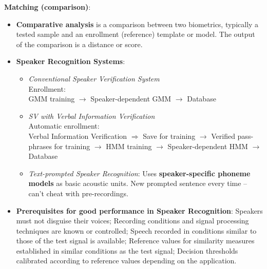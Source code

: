 \documentclass[a4paper]{article}
\begin{document}
      \textbf{Matching (comparison)}:
      \begin{itemize}
        \item \textbf{Comparative analysis} is a comparison between two biometrics, typically a tested sample and an enrollment (reference) template or model. The output of the comparison is a distance or score.
        \item \textbf{Speaker Recognition Systems}:
        \begin{itemize}
          \item \emph{Conventional Speaker Verification System}\\Enrollment: \\
          GMM training $\rightarrow$ Speaker-dependent GMM $\rightarrow$ Database
          \item \emph{SV with Verbal Information Verification}\\Automatic enrollment: \\
          Verbal Information Verification $\Rightarrow$ Save for training $\rightarrow$ Verified pass-phrases for training $\rightarrow$ HMM training $\rightarrow$ Speaker-dependent HMM $\rightarrow$ Database
          \item \emph{Text-prompted Speaker Recognition}: Uses \textbf{speaker-specific phoneme models} as basic acoustic units. New prompted sentence every time -- can't cheat with pre-recordings.
        \end{itemize}
        \item \textbf{Prerequisites for good performance in Speaker Recognition}: Speakers must not disguise their voices; Recording conditions and signal processing techniques are known or controlled; Speech recorded in conditions similar to those of the test signal is available; Reference values for similarity measures established in similar conditions as the test signal; Decision thresholds calibrated according to reference values depending on the application.
      \end{itemize}
    \newpage
\end{document}
